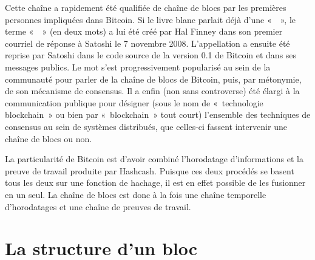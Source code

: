 Cette chaîne a rapidement été qualifiée de chaîne de blocs par les premières personnes impliquées dans Bitcoin. Si le livre blanc parlait déjà d'une «~~», le terme «~~» (en deux mots) a lui été créé par Hal Finney dans son premier courriel de réponse à Satoshi le 7 novembre 2008. L'appellation a ensuite été reprise par Satoshi dans le code source de la version 0.1 de Bitcoin et dans ses messages publics. Le mot  s'est progressivement popularisé au sein de la communauté pour parler de la chaîne de blocs de Bitcoin, puis, par métonymie, de son mécanisme de consensus. Il a enfin (non sans controverse) été élargi à la communication publique pour désigner (sous le nom de «~technologie blockchain~» ou bien par «~blockchain~» tout court) l'ensemble des techniques de consensus au sein de systèmes distribués, que celles-ci fassent intervenir une chaîne de blocs ou non.

La particularité de Bitcoin est d'avoir combiné l'horodatage d'informations et la preuve de travail produite par Hashcash. Puisque ces deux procédés se basent tous les deux sur une fonction de hachage, il est en effet possible de les fusionner en un seul. La chaîne de blocs est donc à la fois une chaîne temporelle d'horodatages et une chaîne de preuves de travail.

\section*{La structure d'un bloc} %


